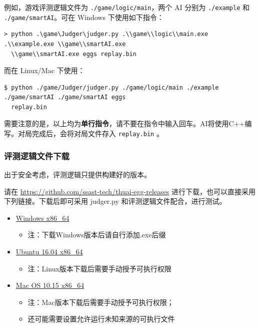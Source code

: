 \documentclass[UTF8]{article}
\begin{document}
例如，游戏评测逻辑文件为 \texttt{./game/logic/main}，两个 AI 分别为
\texttt{./example} 和 \texttt{./game/smartAI}。可在 Windows
下使用如下指令：

\begin{verbatim}
> python .\game\Judger\judger.py .\\game\\logic\\main.exe .\\example.exe \\game\\smartAI.exe
  \\game\\smartAI.exe eggs replay.bin
\end{verbatim}

而在 Linux/Mac 下使用：

\begin{verbatim}
$ python ./game/Judger/judger.py ./game/logic/main ./example ./game/smartAI ./game/smartAI eggs
  replay.bin
\end{verbatim}

需要注意的是，以上均为\textbf{单行指令}，请不要在指令中输入回车。AI将使用C++编写。对局完成后，会将对局文件存入 \texttt{replay.bin} 。

\hypertarget{header-n58}{%
\subsubsection{评测逻辑文件下载}\label{header-n58}}

出于安全考虑，评测逻辑只提供构建好的版本。\par 请在
\url{https://github.com/ssast-tech/thuai-egg-releases}
进行下载，也可以直接采用下列链接。下载后即可采用 judger.py
和评测逻辑文件配合，进行测试。

\begin{itemize}
\item
  \href{https://cdn.jsdelivr.net/gh/ssast-tech/thuai-egg-releases/eggs-windows-x86_64}{Windows
  x86\_64}

  \begin{itemize}
  \item
    注：下载Windows版本后请自行添加.exe后缀
  \end{itemize}
\item
  \href{https://cdn.jsdelivr.net/gh/ssast-tech/thuai-egg-releases/eggs-ubuntu-16.04-x86_64}{Ubuntu
  16.04 x86\_64}

  \begin{itemize}
  \item
    注：Linux版本下载后需要手动授予可执行权限
  \end{itemize}
\item
  \href{https://cdn.jsdelivr.net/gh/ssast-tech/thuai-egg-releases/eggs-macos-10.15-x86_64}{Mac
  OS 10.15 x86\_64}

  \begin{itemize}
  \item
    注：Mac版本下载后需要手动授予可执行权限；
  \item
    还可能需要设置允许运行未知来源的可执行文件
  \end{itemize}
\end{itemize}
\end{document}
